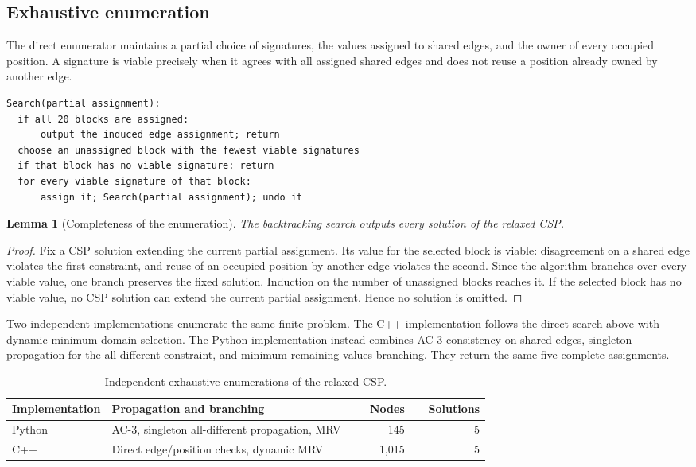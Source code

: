 \documentclass[11pt]{article}
\newtheorem{lemma}[theorem]{Lemma}
\theoremstyle{definition}
\begin{document}
\subsection{Exhaustive enumeration}

The direct enumerator maintains a partial choice of signatures, the values assigned to shared edges, and the owner of every occupied position.  A signature is viable precisely when it agrees with all assigned shared edges and does not reuse a position already owned by another edge.

\begin{lstlisting}
Search(partial assignment):
  if all 20 blocks are assigned:
      output the induced edge assignment; return
  choose an unassigned block with the fewest viable signatures
  if that block has no viable signature: return
  for every viable signature of that block:
      assign it; Search(partial assignment); undo it
\end{lstlisting}

\begin{lemma}[Completeness of the enumeration]\label{lem:csp-complete}
The backtracking search outputs every solution of the relaxed CSP.
\end{lemma}
\begin{proof}
Fix a CSP solution extending the current partial assignment.  Its value for the selected block is viable: disagreement on a shared edge violates the first constraint, and reuse of an occupied position by another edge violates the second.  Since the algorithm branches over every viable value, one branch preserves the fixed solution.  Induction on the number of unassigned blocks reaches it.  If the selected block has no viable value, no CSP solution can extend the current partial assignment.  Hence no solution is omitted.
\end{proof}

Two independent implementations enumerate the same finite problem.  The C++ implementation follows the direct search above with dynamic minimum-domain selection.  The Python implementation instead combines AC-3 consistency on shared edges, singleton propagation for the all-different constraint, and minimum-remaining-values branching.  They return the same five complete assignments.

\begin{table}[ht]
\centering
\caption{Independent exhaustive enumerations of the relaxed CSP.}
\label{tab:csp-enumeration}
\small
\begin{tabular}{@{}p{0.18\linewidth}p{0.52\linewidth}rr@{}}
\toprule
Implementation & Propagation and branching & Nodes & Solutions\\
\midrule
Python & AC-3, singleton all-different propagation, MRV & 145 & 5\\
C++ & Direct edge/position checks, dynamic MRV & 1,015 & 5\\
\bottomrule
\end{tabular}
\end{table}
\end{document}
